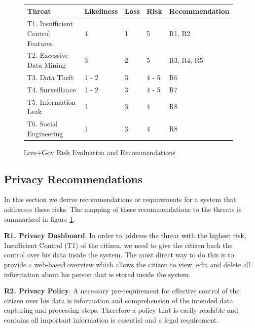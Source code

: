 \documentclass[runningheads,a4paper]{llncs}
\begin{document}
\begin{figure}
\centering
\begin{tabular}{|l|l|l|l|l|}
\hline
\textbf{Threat}                   & \textbf{Likeliness} & \textbf{Loss} & \textbf{Risk} & \textbf{Recommendation}
\\\hline
T1. Insufficient Control Features & 4                   & 1             & 5             & R1, R2
\\\hline
T2. Excessive Data Mining         & 3                   & 2             & 5             & R3, R4, R5
\\\hline
T3. Data Theft                    & 1 - 2               & 3             & 4 - 5         & R6
\\\hline
T4. Surveillance                  & 1 - 2               & 3             & 4 - 5         & R7
\\\hline
T5. Information Leak              & 1                   & 3             & 4             & R8
\\\hline
T6. Social Engineering            & 1                   & 3             & 4             & R8
\\\hline
\end{tabular}
\caption{Live+Gov Risk Evaluation and Recommendations}
\label{fig:risks}
\end{figure}


\subsection{Privacy Recommendations}
\label{subsec:priv-rec}

In this section we derive recommendations or
requirements for a system that addresses these risks. The mapping of these recommendations to the threats is summarized in figure \ref{fig:risks}.

\textbf{R1. Privacy Dashboard}. In order to address the threat with the highest risk, Insufficient Control (T1) of the citizen, we need to give the citizen back the
control over his data inside the system. The most direct way to do
this is to provide a web-based overview which allows the citizen to view, edit and delete all information about his person
that is stored inside the system. 

\textbf{R2. Privacy Policy}. A necessary pre-requirement for effective control of the citizen over his data is information and comprehension of the intended data capturing and processing steps. Therefore a policy that
is easily readable and contains all important information is essential and a legal requirement.
\end{document}
